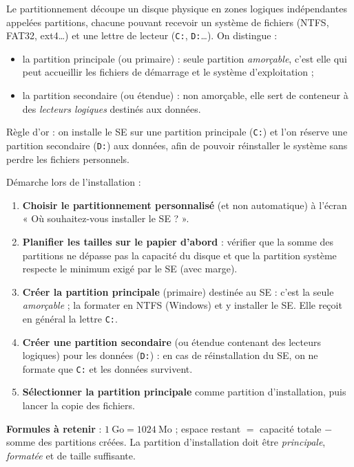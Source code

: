 \documentclass[11pt]{article}
\newcommand{\cle}[1]{{\popxbold\color{popdark}#1}}
\begin{document}
\begin{definition}
Le \cle{partitionnement} découpe un disque physique en zones logiques indépendantes appelées partitions, chacune pouvant recevoir un système de fichiers (NTFS, FAT32, ext4\ldots) et une lettre de lecteur (\texttt{C:}, \texttt{D:}\ldots). On distingue :
\begin{itemize}
\item la \cle{partition principale} (ou primaire) : seule partition \emph{amorçable}, c'est elle qui peut accueillir les fichiers de démarrage et le système d'exploitation ;
\item la \cle{partition secondaire} (ou étendue) : non amorçable, elle sert de conteneur à des \emph{lecteurs logiques} destinés aux données.
\end{itemize}
Règle d'or : on installe le SE sur une partition principale (\texttt{C:}) et l'on réserve une partition secondaire (\texttt{D:}) aux données, afin de pouvoir réinstaller le système sans perdre les fichiers personnels.
\end{definition}

\begin{methode}
Démarche lors de l'installation :
\begin{enumerate}
\item \textbf{Choisir le partitionnement personnalisé} (et non automatique) à l'écran « Où souhaitez-vous installer le SE ? ».
\item \textbf{Planifier les tailles sur le papier d'abord} : vérifier que la somme des partitions ne dépasse pas la capacité du disque et que la partition système respecte le minimum exigé par le SE (avec marge).
\item \textbf{Créer la partition principale} (primaire) destinée au SE : c'est la seule \emph{amorçable} ; la formater en \cle{NTFS} (Windows) et y installer le SE. Elle reçoit en général la lettre \texttt{C:}.
\item \textbf{Créer une partition secondaire} (ou étendue contenant des lecteurs logiques) pour les données (\texttt{D:}) : en cas de réinstallation du SE, on ne formate que \texttt{C:} et les données survivent.
\item \textbf{Sélectionner la partition principale} comme partition d'installation, puis lancer la copie des fichiers.
\end{enumerate}
\textbf{Formules à retenir} : $1\ \text{Go} = 1024\ \text{Mo}$ ; espace restant $=$ capacité totale $-$ somme des partitions créées. La partition d'installation doit être \emph{principale}, \emph{formatée} et de taille suffisante.
\end{methode}
\end{document}
